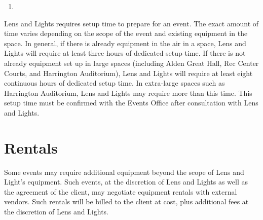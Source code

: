 \begin{enumerate}
    \item 
\end{enumerate}

Lens and Lights requires setup time to prepare for an event. The exact amount of
time varies depending on the scope of the event and existing equipment in the
space. In general, if there is already equipment in the air in a space, Lens and
Lights will require at least three hours of dedicated setup time. If there is
not already equipment set up in large spaces (including Alden Great Hall, Rec
Center Courts, and Harrington Auditorium), Lens and Lights will require at least
eight continuous hours of dedicated setup time. In extra-large spaces such as
Harrington Auditorium, Lens and Lights may require more than this time. This
setup time must be confirmed with the Events Office after consultation with Lens
and Lights.

\section{Rentals}

Some events may require additional equipment beyond the scope of Lens and
Light's equipment. Such events, at the discretion of Lens and Lights as well as
the agreement of the client, may negotiate equipment rentals with external
vendors. Such rentals will be billed to the client at cost, plus additional fees
at the discretion of Lens and Lights.


